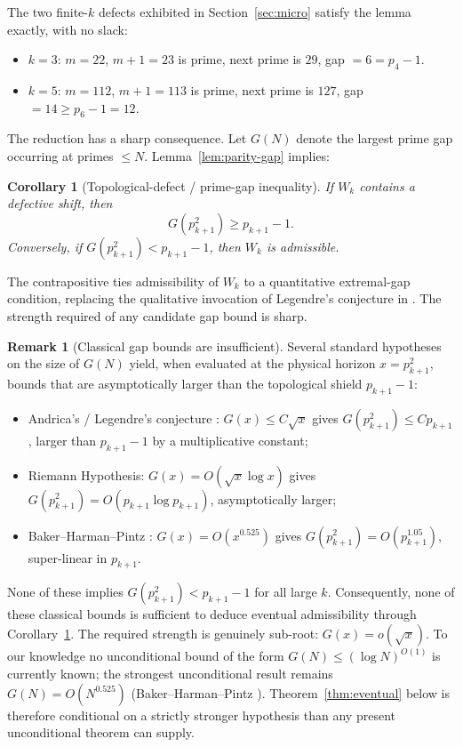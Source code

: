\documentclass[11pt,a4paper]{article}
\newtheorem{corollary}{Corollary}
\theoremstyle{definition}
\newtheorem{remark}{Remark}
\begin{document}
The two finite-$k$ defects exhibited in Section~\ref{sec:micro} satisfy
the lemma exactly, with no slack:
\begin{itemize}
\item $k = 3$: $m = 22$, $m + 1 = 23$ is prime, next prime is $29$, gap $= 6 = p_4 - 1$.
\item $k = 5$: $m = 112$, $m + 1 = 113$ is prime, next prime is $127$, gap $= 14 \geq p_6 - 1 = 12$.
\end{itemize}

The reduction has a sharp consequence. Let $G(N)$ denote the largest
prime gap occurring at primes $\leq N$. Lemma~\ref{lem:parity-gap}
implies:

\begin{corollary}[Topological-defect / prime-gap inequality]
\label{cor:gap-inequality}
If $W_k$ contains a defective shift, then
\[
    G(p_{k+1}^2) \geq p_{k+1} - 1.
\]
Conversely, if $G(p_{k+1}^2) < p_{k+1} - 1$, then $W_k$ is admissible.
\end{corollary}

The contrapositive ties admissibility of $W_k$ to a quantitative
extremal-gap condition, replacing the qualitative invocation of
Legendre's conjecture in \cite{wang2026emergence}. The strength
required of any candidate gap bound is sharp.

\begin{remark}[Classical gap bounds are insufficient]
\label{rem:classical-insufficient}
Several standard hypotheses on the size of $G(N)$ yield, when evaluated
at the physical horizon $x = p_{k+1}^2$, bounds that are
asymptotically larger than the topological shield $p_{k+1} - 1$:
\begin{itemize}
\item Andrica's / Legendre's conjecture \cite{andrica1986conjecture}: $G(x) \leq C \sqrt{x}$ gives
      $G(p_{k+1}^2) \leq C p_{k+1}$, larger than $p_{k+1} - 1$ by a
      multiplicative constant;
\item Riemann Hypothesis: $G(x) = O(\sqrt{x} \log x)$ gives
      $G(p_{k+1}^2) = O(p_{k+1} \log p_{k+1})$, asymptotically larger;
\item Baker--Harman--Pintz \cite{baker2001difference}:
      $G(x) = O(x^{0.525})$ gives $G(p_{k+1}^2) = O(p_{k+1}^{1.05})$,
      super-linear in $p_{k+1}$.
\end{itemize}
None of these implies $G(p_{k+1}^2) < p_{k+1} - 1$ for all large $k$.
Consequently, none of these classical bounds is sufficient to deduce
eventual admissibility through Corollary~\ref{cor:gap-inequality}.
The required strength is genuinely sub-root: $G(x) = o(\sqrt{x})$.
To our knowledge no unconditional bound of the form
$G(N) \leq (\log N)^{O(1)}$ is currently known; the strongest
unconditional result remains $G(N) = O(N^{0.525})$
(Baker--Harman--Pintz \cite{baker2001difference}). Theorem~\ref{thm:eventual}
below is therefore conditional on a strictly stronger hypothesis than
any present unconditional theorem can supply.
\end{remark}
\end{document}
